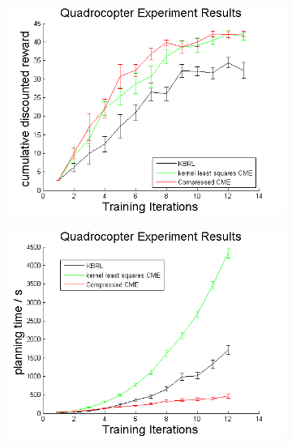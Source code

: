 \documentclass[letterpaper]{article}
\begin{document}
\begin{figure}[htb]
\centering
\begin{subfigure}[b]{0.3\textwidth}
\includegraphics[clip, width=\textwidth]{Quadrewards.png}
\end{subfigure}
\begin{subfigure}[b]{0.3\textwidth}
\includegraphics[clip, width=\textwidth]{Quadplanning.png}
\end{subfigure}
\begin{subfigure}[b]{0.3\textwidth}

\end{subfigure}
\end{figure}
\end{document}
